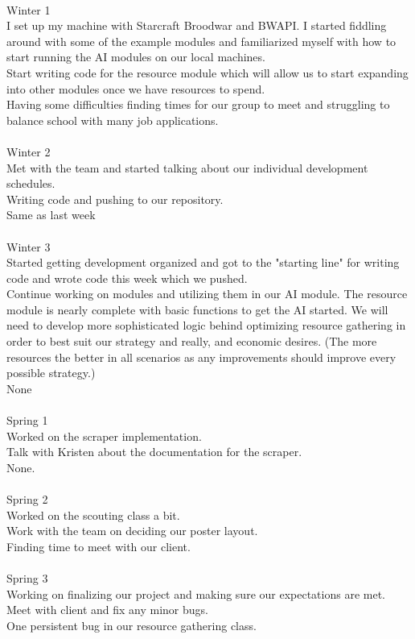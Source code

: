 \documentclass[10pt,letterpaper,onecolumn,draftclsnofoot]{IEEEtran}
\begin{document}
\\
Winter 1\\
I set up my machine with Starcraft Broodwar and BWAPI. I started fiddling around with some of the example modules and familiarized myself with how to start running the AI modules on our local machines.\\ Start writing code for the resource module which will allow us to start expanding into other modules once we have resources to spend.\\ Having some difficulties finding times for our group to meet and struggling to balance school with many job applications.\\
\\
Winter 2\\
Met with the team and started talking about our individual development schedules.\\ Writing code and pushing to our repository.\\ Same as last week\\
\\
Winter 3\\
Started getting development organized and got to the "starting line" for writing code and wrote code this week which we pushed.\\ Continue working on modules and utilizing them in our AI module. The resource module is nearly complete with basic functions to get the AI started. We will need to develop more sophisticated logic behind optimizing resource gathering in order to best suit our strategy and really, and economic desires. (The more resources the better in all scenarios as any improvements should improve every possible strategy.)\\ None\\
\\
Spring 1\\
Worked on the scraper implementation.\\ Talk with Kristen about the documentation for the scraper.\\ None.\\
\\
Spring 2\\
Worked on the scouting class a bit.\\ Work with the team on deciding our poster layout.\\ Finding time to meet with our client.\\
\\
Spring 3\\
Working on finalizing our project and making sure our expectations are met.\\ Meet with client and fix any minor bugs.\\ One persistent bug in our resource gathering class.\\
\end{document}
